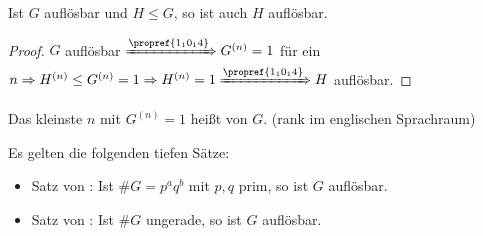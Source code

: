 \begin{conclusion}
	Ist $G$ auflösbar und $H \leq G$, so ist auch $H$ auflösbar.
\end{conclusion}

\begin{proof}
	$G$ auflösbar $\xRightarrow{\propref{1_10_14}} G^{(n)} = 1$ für ein $n \Rightarrow H^{(n)} \leq G^{(n)} = 1 \Rightarrow H^{(n)} = 1 \xRightarrow{\propref{1_10_14}} H$ auflösbar.
\end{proof}

\begin{remark}
	Das kleinste $n$ mit $G^{(n)} = 1$ heißt  von $G$. (rank im englischen Sprachraum)
\end{remark}

\begin{remark}
	Es gelten die folgenden tiefen Sätze:
	\begin{itemize}
		\item Satz von : Ist $\#G = p^{a}q^{b}$ mit $p,q$ prim, so ist $G$ auflösbar.
		\item Satz von : Ist $\#G$ ungerade, so ist $G$ auflösbar.
	\end{itemize}
\end{remark}